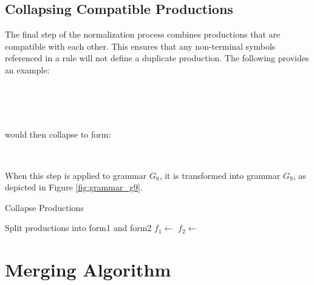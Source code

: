 \documentclass[10pt,nocc]{xrese_report}
\begin{document}
\subsection{Collapsing Compatible Productions}

The final step of the normalization process combines productions that are compatible with each other. This ensures that any non-terminal symbols referenced in a rule will not define a duplicate production. The following provides an example:

\begin{bnf*}
\\
\\
\\
\end{bnf*}

\noindent would then collapse to form:

\begin{bnf*}
\\
\end{bnf*}


\noindent When this step is applied to grammar $G_8$, it is transformed into grammar $G_9$, as depicted in Figure \ref{fig:grammar_g9}.

\begin{algorithm}[tb]
\caption{Collapse Productions}\label{alg:coll_prod}
 \begin{algorithmic}[1]
    \LineComment Split productions into form1 and form2
    \State $f_1 \gets$ 
    \State $f_2 \gets$ 
        \State {}
      \EndIf
    \EndFor
        \State {}
      \EndIf
    \EndFor
  \EndFunction
 \end{algorithmic}

\end{algorithm}


\section{Merging Algorithm}\label{sec:merge_alg}
\end{document}
